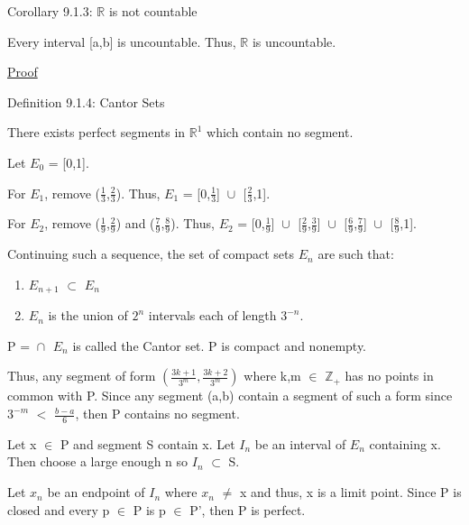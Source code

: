 	\vspace{0.5CM}

{ \color{orange} Corollary 9.1.3: $\mathbb{R}$ is not countable } 

	\begin{adjustbox}{minipage=14cm, right, vspace=0.1cm 0cm}
		Every interval [a,b] is uncountable.
		Thus, $\mathbb{R}$ is uncountable.
	\end{adjustbox}

{ \color{magenta} \underline{Proof} }


	 \vspace{0.5cm}

{ \color{blue} Definition 9.1.4: Cantor Sets } 

	\begin{adjustbox}{minipage=14cm, right, vspace=0.1cm 0cm}
		There exists perfect segments in $\mathbb{R}^1$ which contain no segment.

		Let $E_0$ = [0,1].

		For $E_1$, remove ($\frac{1}{3}$,$\frac{2}{3}$).
		Thus, $E_1$ = [0,$\frac{1}{3}$] $\cup_{}^{}$ [$\frac{2}{3}$,1].

		For $E_2$, remove ($\frac{1}{9}$,$\frac{2}{9}$) and ($\frac{7}{9}$,$\frac{8}{9}$).
		Thus, $E_2$ = [0,$\frac{1}{9}$] $\cup_{}^{}$ [$\frac{2}{9}$,$\frac{3}{9}$] $\cup_{}^{}$
		[$\frac{6}{9}$,$\frac{7}{9}$] $\cup_{}^{}$ [$\frac{8}{9}$,1].

		Continuing such a sequence, the set of compact sets $E_n$ are such that:

		\begin{enumerate}[label=(\alph*), leftmargin=2cm, itemsep=0.1cm]
			\item $E_{n+1}$ $\subset$ $E_n$
			\item $E_n$ is the union of $2^n$ intervals each of length $3^{-n}$.
		\end{enumerate}

		P = $\cap_{}^{}$ $E_n$ is called the Cantor set.
		P is compact and nonempty.

		Thus, any segment of form $(\frac{3k+1}{3^m},\frac{3k+2}{3^m})$
		where k,m $\in$ $\mathbb{Z}_+$ has no points in common with P.
		Since any segment (a,b) contain a segment of such a form since
		$3^{-m}$ $<$ $\frac{b-a}{6}$, then P contains no segment.

		Let x $\in$ P and segment S contain x. Let $I_n$ be an interval of
		$E_n$ containing x. Then choose a large enough n so $I_n$ $\subset$ S.
		
		Let $x_n$ be an endpoint of $I_n$ where $x_n$ $\not =$ x and thus,
		x is a limit point. Since P is closed and every p $\in$ P is p $\in$ P',
		then P is perfect.
	\end{adjustbox}

